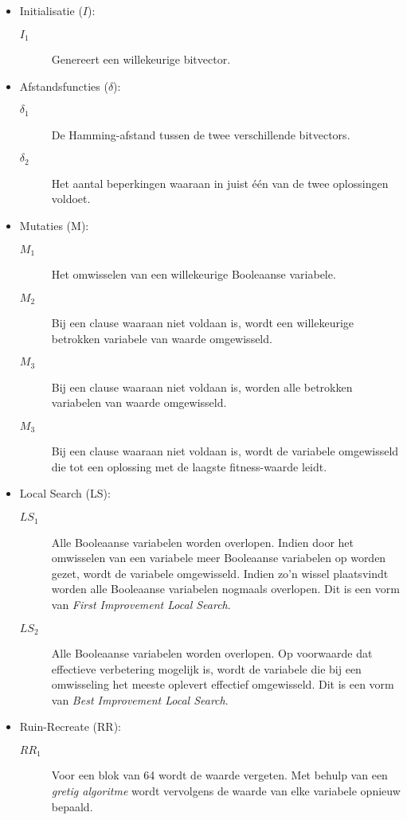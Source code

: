 \begin{itemize}
 \item Initialisatie ($I$):
\begin{description}
 \item [$I_1$] Genereert een willekeurige bitvector.
\end{description}
 \item Afstandsfuncties ($\delta$):
\begin{description}
 \item [$\delta_1$] De Hamming-afstand tussen de twee verschillende bitvectors.
 \item [$\delta_2$] Het aantal beperkingen waaraan in juist \'e\'en van de twee oplossingen voldoet.
\end{description}
 \item Mutaties (M):
\begin{description}
 \item [$M_1$] Het omwisselen van een willekeurige Booleaanse variabele.
 \item [$M_2$] Bij een clause waaraan niet voldaan is, wordt een willekeurige betrokken variabele van waarde omgewisseld.
 \item [$M_3$] Bij een clause waaraan niet voldaan is, worden alle betrokken variabelen van waarde omgewisseld.
 \item [$M_3$] Bij een clause waaraan niet voldaan is, wordt de variabele omgewisseld die tot een oplossing met de laagste fitness-waarde leidt.
\end{description}
 \item Local Search (LS):
\begin{description}
 \item [$LS_1$] Alle Booleaanse variabelen worden overlopen. Indien door het omwisselen van een variabele meer Booleaanse variabelen op \true{} worden gezet, wordt de variabele omgewisseld. Indien zo'n wissel plaatsvindt worden alle Booleaanse variabelen nogmaals overlopen. Dit is een vorm van \emph{First Improvement Local Search}.
 \item [$LS_2$] Alle Booleaanse variabelen worden overlopen. Op voorwaarde dat effectieve verbetering mogelijk is, wordt de variabele die bij een omwisseling het meeste oplevert effectief omgewisseld. Dit is een vorm van \emph{Best Improvement Local Search}.
\end{description}
 \item Ruin-Recreate (RR):
\begin{description}
 \item [$RR_1$] Voor een blok van 64 wordt de waarde vergeten. Met behulp van een \emph{gretig algoritme} wordt vervolgens de waarde van elke variabele opnieuw bepaald.

\end{description}
\end{itemize}
